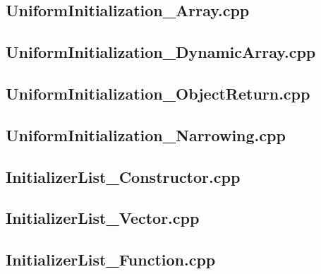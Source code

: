 \documentclass[11pt]{report}
\begin{document}
\begin{appendix}
\subsection{UniformInitialization\_Array.cpp}
\label{UniformInitialization_Array}


\subsection{UniformInitialization\_DynamicArray.cpp}
\label{UniformInitialization_DynamicArray}


\subsection{UniformInitialization\_ObjectReturn.cpp}
\label{UniformInitialization_ObjectReturn}


\subsection{UniformInitialization\_Narrowing.cpp}
\label{UniformInitialization_Narrowing}


\subsection{InitializerList\_Constructor.cpp}
\label{InitializerList_Constructor}


\subsection{InitializerList\_Vector.cpp}
\label{InitializerList_Vector}


\subsection{InitializerList\_Function.cpp}
\label{InitializerList_Function}



\end{appendix}
\end{document}

